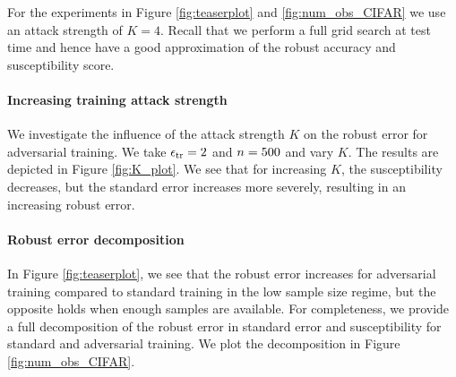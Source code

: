 For the experiments in Figure \ref{fig:teaserplot} and \ref{fig:num_obs_CIFAR} we use an attack strength of $K = 4$. Recall that we perform a full grid search at test time and hence have a good approximation of the robust accuracy and susceptibility score. 

\paragraph{Increasing training attack strength} We investigate the influence of the attack strength $K$ on the robust error for adversarial training. We take $\epsilon_{\text{tr}} = 2$ and $n = 500$ and vary $K$. The results are depicted in Figure \ref{fig:K_plot}. We see that for increasing $K$, the susceptibility decreases, but the standard error increases more severely, resulting in an increasing robust error. 


\paragraph{Robust error decomposition}
In Figure \ref{fig:teaserplot}, we see that the robust error increases for adversarial training compared to standard training in the low sample size regime, but the opposite holds when enough samples are available. For completeness, we provide a full decomposition of the robust error in standard error and susceptibility for standard and adversarial training. We plot the decomposition in Figure \ref{fig:num_obs_CIFAR}.


